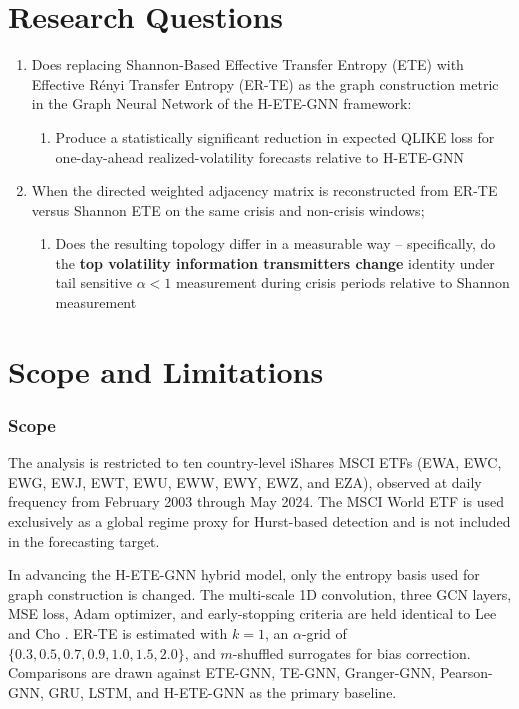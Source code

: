 \documentclass[12pt,oneside]{report}
\begin{document}
\section{Research Questions}

\begin{enumerate}
  \item Does replacing Shannon-Based Effective Transfer Entropy (ETE)
        with Effective Rényi Transfer Entropy (ER-TE) as the graph
        construction metric in the Graph Neural Network of the H-ETE-GNN
        framework:
        \begin{enumerate}[label=(\alph*)]
          \item Produce a statistically significant reduction in expected
                QLIKE loss for one-day-ahead realized-volatility forecasts
                relative to H-ETE-GNN
        \end{enumerate}
  \item When the directed weighted adjacency matrix is reconstructed from
        ER-TE versus Shannon ETE on the same crisis and non-crisis
        windows;
        \begin{enumerate}[label=(\alph*)]
          \item Does the resulting topology differ in a measurable way --
                specifically, do the \textbf{top volatility information
                transmitters change} identity under tail sensitive
                $\alpha < 1$ measurement during crisis periods relative to
                Shannon measurement
        \end{enumerate}
\end{enumerate}

\section{Scope and Limitations}\label{sec:scope}

\subsubsection*{Scope}

The analysis is restricted to ten country-level iShares MSCI ETFs (EWA,
EWC, EWG, EWJ, EWT, EWU, EWW, EWY, EWZ, and EZA), observed at daily
frequency from February 2003 through May 2024. The MSCI World ETF is
used exclusively as a global regime proxy for Hurst-based detection and
is not included in the forecasting target.

In advancing the H-ETE-GNN hybrid model, only the entropy basis used for
graph construction is changed. The multi-scale 1D convolution, three GCN
layers, MSE loss, Adam optimizer, and early-stopping criteria are held
identical to Lee and Cho \cite{lee2025}. ER-TE is estimated with
$k = 1$, an $\alpha$-grid of $\{0.3, 0.5, 0.7, 0.9, 1.0, 1.5, 2.0\}$, and
$m$-shuffled surrogates for bias correction. Comparisons are drawn
against ETE-GNN, TE-GNN, Granger-GNN, Pearson-GNN, GRU, LSTM, and
H-ETE-GNN as the primary baseline.
\end{document}
